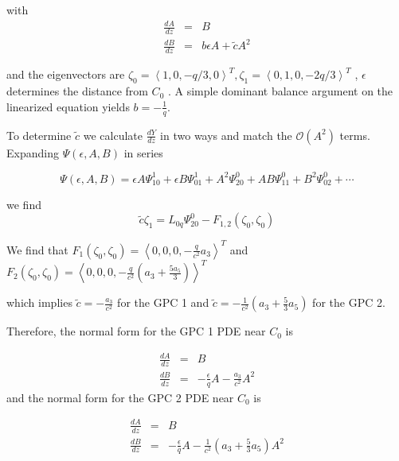 with 
\begin{subequations}
\begin{eqnarray}
\frac{dA}{dz} &=& B \\
\frac{dB}{dz} &=& b \epsilon A + \tilde{c} A^2
\end{eqnarray}
\end{subequations}


and the eigenvectors are $\zeta_0 = \left<1,0,-q/3,0\right>^T, \zeta_1 = \left<0,1,0,-2 q/3\right>^T $ , $\epsilon$ determines the distance from $C_0$ .
A simple dominant balance argument on the linearized equation yields $b=-\frac{1}{q}$.


To determine $\tilde{c}$ we calculate $\frac{dY}{dz}$ in two ways and match the $\mathcal{O}(A^2)$ terms. Expanding $\Psi(\epsilon,A,B)$ in series 

\begin{equation}
\Psi(\epsilon,A,B) = \epsilon A \Psi_{10}^1 + \epsilon B \Psi_{01}^1 + A^2 \Psi_{20}^0 + A B \Psi_{11}^0 + B^2 \Psi_{02}^0 + \cdots
\end{equation}

we find \begin{equation} \tilde{c} \zeta_1 = L_{0q} \Psi_{20}^0 - F_{1,2}(\zeta_0,\zeta_0) \end{equation}

We find that $F_1(\zeta_0,\zeta_0) = \left<0,0,0,-\frac{q }{c^2} a_3 \right>^T$  and $F_2(\zeta_0,\zeta_0) = \left<0,0,0,-\frac{ q }{c^2}\left( a_3 + \frac{5 a_5}{3}\right) \right>^T$

which implies $\tilde{c} = - \frac{a_3}{c^2} $ for the GPC 1 and $\tilde{c} = -\frac{1}{c^2} \left(a_3 + \frac{5}{3} a_5 \right) $ for the GPC 2.

Therefore, the normal form for the GPC 1 PDE near $C_0$ is

\begin{subequations}
\begin{eqnarray}
\frac{dA}{dz} &=& B \\
\frac{dB}{dz} &=& -\frac{\epsilon}{q} A - \frac{a_3}{c^2}  A^2
\end{eqnarray}
\end{subequations}
 and the normal form for the GPC 2 PDE near $C_0$ is

\begin{subequations}
\begin{eqnarray}
\frac{dA}{dz} &=& B \\
\frac{dB}{dz} &=& -\frac{\epsilon}{q} A -\frac{1}{c^2} \left(a_3 + \frac{5}{3} a_5 \right)  A^2
\end{eqnarray}
\end{subequations}

